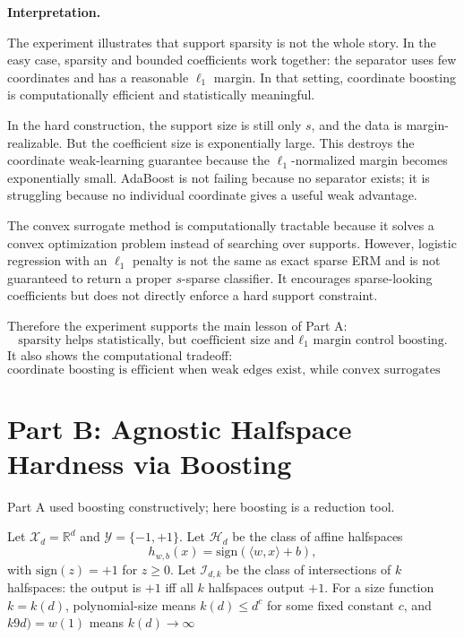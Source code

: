 \documentclass[11pt]{article}
\newcommand{\sign}{\mathrm{sign}}
\begin{document}
\begin{enumerate}
\begin{solutionbox}
    \medskip

    \textbf{Interpretation.}

    The experiment illustrates that support sparsity is not the whole story. In the easy case,
    sparsity and bounded coefficients work together: the separator uses few coordinates and has a
    reasonable $\ell_1$ margin. In that setting, coordinate boosting is computationally efficient
    and statistically meaningful.

    In the hard construction, the support size is still only $s$, and the data is margin-realizable.
    But the coefficient size is exponentially large. This destroys the coordinate weak-learning
    guarantee because the $\ell_1$-normalized margin becomes exponentially small. AdaBoost is not
    failing because no separator exists; it is struggling because no individual coordinate gives a
    useful weak advantage.

    The convex surrogate method is computationally tractable because it solves a convex
    optimization problem instead of searching over supports. However, logistic regression with an
    $\ell_1$ penalty is not the same as exact sparse ERM and is not guaranteed to return a proper
    $s$-sparse classifier. It encourages sparse-looking coefficients but does not directly enforce
    a hard support constraint.

    Therefore the experiment supports the main lesson of Part A:
    \[
    \boxed{
    \text{sparsity helps statistically, but coefficient size and }\ell_1\text{ margin control boosting.}
    }
    \]
    It also shows the computational tradeoff:
    \[
    \boxed{
    \text{coordinate boosting is efficient when weak edges exist, while convex surrogates are efficient but different.}
    }
    \]
    \end{solutionbox}
\end{enumerate}

\section{Part B: Agnostic Halfspace Hardness via Boosting}

Part A used boosting constructively; here boosting is a reduction tool.

Let $\mathcal X_d=\mathbb R^d$ and $\mathcal Y=\{-1,+1\}$. Let $\mathcal H_d$ be the class of affine halfspaces
\[
h_{w,b}(x)=\sign(\langle w,x\rangle+b),
\]
with $\sign(z)=+1$ for $z\ge0$. Let $\mathcal I_{d,k}$ be the class of intersections of $k$ halfspaces: the output is $+1$ iff all $k$ halfspaces output $+1$. For a size function $k=k(d)$, polynomial-size means $k(d)\le d^c$ for some fixed constant $c$, and $k9d)=w(1)$ means $k(d)\rightarrow \infty$
\end{document}
